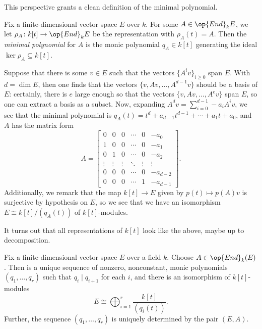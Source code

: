 \documentclass[../notes.tex]{subfiles}
\begin{document}
This perspective grants a clean definition of the minimal polynomial.
\begin{definition}
	Fix a finite-dimensional vector space $E$ over $k$. For some $A\in\op{End}_kE$, we let $\rho_A\colon k[t]\to\op{End}_kE$ be the representation with $\rho_A(t)=A$. Then the \textit{minimal polynomial} for $A$ is the monic polynomial $q_A\in k[t]$ generating the ideal $\ker\rho_A\subseteq k[t]$.
\end{definition}
\begin{example} \label{ex:cyclic-kt-module}
	Suppose that there is some $v\in E$ such that the vectors $\{A^iv\}_{i\ge0}$ span $E$. With $d=\dim E$, then one finds that the vectors $\{v,Av,\ldots,A^{d-1}v\}$ should be a basis of $E$: certainly, there is $e$ large enough so that the vectors $\{v,Av,\ldots,A^ev\}$ span $E$, so one can extract a basis as a subset. Now, expanding $A^dv=\sum_{i=0}^{d-1}-a_iA^iv$, we see that the minimal polynomial is $q_A(t)=t^d+a_{d-1}t^{d-1}+\cdots+a_1t+a_0$, and $A$ has the matrix form
	\[A=\begin{bmatrix}
		0 & 0 & 0 & \cdots & 0 & -a_0 \\
		1 & 0 & 0 & \cdots & 0 & -a_1 \\
		0 & 1 & 0 & \cdots & 0 & -a_2 \\
		\vdots & \vdots & \vdots & \ddots & \vdots & \vdots \\
		0 & 0 & 0 & \cdots & 0 & -a_{d-2} \\
		0 & 0 & 0 & \cdots & 1 & -a_{d-1}
	\end{bmatrix}.\]
	Additionally, we remark that the map $k[t]\to E$ given by $p(t)\mapsto p(A)v$ is surjective by hypothesis on $E$, so we see that we have an isomorphism $E\cong k[t]/(q_A(t))$ of $k[t]$-modules.
\end{example}
It turns out that all representations of $k[t]$ look like the above, maybe up to decomposition.
\begin{theorem} \label{thm:jordan-normal}
	Fix a finite-dimensional vector space $E$ over a field $k$. Choose $A\in\op{End}_k(E)$. Then is a unique sequence of nonzero, nonconstant, monic polynomials $(q_1,\ldots,q_r)$ such that $q_i\mid q_{i+1}$ for each $i$, and there is an isomorphism of $k[t]$-modules
	\[E\cong\bigoplus_{i=1}^r\frac{k[t]}{(q_i(t))}.\]
	Further, the sequence $(q_1,\ldots,q_r)$ is uniquely determined by the pair $(E,A)$.
\end{theorem}
\end{document}

